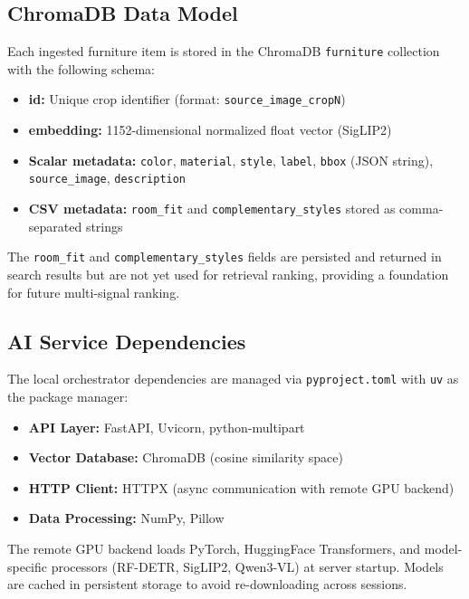 \subsection{ChromaDB Data Model}

Each ingested furniture item is stored in the ChromaDB \texttt{furniture} collection with the following schema:

\begin{itemize}
    \item \textbf{id:} Unique crop identifier (format: \texttt{source\_image\_cropN})
    \item \textbf{embedding:} 1152-dimensional normalized float vector (SigLIP2)
    \item \textbf{Scalar metadata:} \texttt{color}, \texttt{material}, \texttt{style}, \texttt{label}, \texttt{bbox} (JSON string), \texttt{source\_image}, \texttt{description}
    \item \textbf{CSV metadata:} \texttt{room\_fit} and \texttt{complementary\_styles} stored as comma-separated strings
\end{itemize}

The \texttt{room\_fit} and \texttt{complementary\_styles} fields are persisted and returned in search results but are not yet used for retrieval ranking, providing a foundation for future multi-signal ranking.

\subsection{AI Service Dependencies}

The local orchestrator dependencies are managed via \texttt{pyproject.toml} with \texttt{uv} as the package manager:

\begin{itemize}
    \item \textbf{API Layer:} FastAPI, Uvicorn, python-multipart
    \item \textbf{Vector Database:} ChromaDB (cosine similarity space)
    \item \textbf{HTTP Client:} HTTPX (async communication with remote GPU backend)
    \item \textbf{Data Processing:} NumPy, Pillow
\end{itemize}

The remote GPU backend loads PyTorch, HuggingFace Transformers, and model-specific processors (RF-DETR, SigLIP2, Qwen3-VL) at server startup. Models are cached in persistent storage to avoid re-downloading across sessions.

